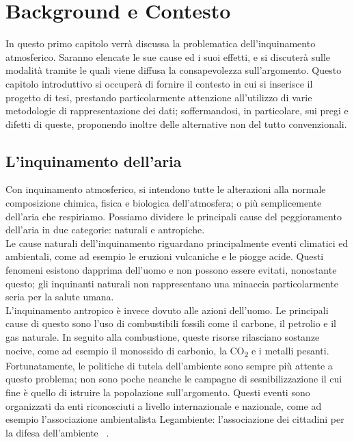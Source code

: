 \clearpage{\pagestyle{empty}\cleardoublepage}
\chapter{Background e Contesto}                %
\lhead[\fancyplain{}{\bfseries\thepage}]{\fancyplain{}{\bfseries\rightmark}}

In questo primo capitolo verrà discussa la problematica dell'inquinamento atmosferico.
Saranno elencate le sue cause ed i suoi effetti, e si discuterà sulle modalità tramite le quali viene diffusa la consapevolezza sull'argomento.
Questo capitolo introduttivo si occuperà di fornire il contesto in cui si inserisce il progetto di tesi, prestando particolarmente attenzione all'utilizzo di varie metodologie di rappresentazione dei dati; soffermandosi, in particolare, sui pregi e difetti di queste, proponendo inoltre delle alternative non del tutto convenzionali.

\section{L'inquinamento dell'aria}
Con inquinamento atmosferico, si intendono tutte le alterazioni alla normale composizione chimica, fisica e biologica dell’atmosfera; o più semplicemente dell’aria che respiriamo.
Possiamo dividere le principali cause del peggioramento dell’aria in due categorie: naturali e antropiche.
\\
Le cause naturali dell'inquinamento riguardano principalmente eventi climatici ed ambientali, come ad esempio le eruzioni vulcaniche e le piogge acide.
Questi fenomeni esistono dapprima dell'uomo e non possono essere evitati, nonostante questo; gli inquinanti naturali non rappresentano una minaccia particolarmente seria per la salute umana.
\\
L'inquinamento antropico è invece dovuto alle azioni dell'uomo. Le principali cause di questo sono l’uso di combustibili fossili come il carbone, il petrolio e il gas naturale.
In seguito alla combustione, queste risorse rilasciano sostanze nocive, come ad esempio il monossido di carbonio, la CO\textsubscript{2} e i metalli pesanti.
Fortunatamente, le politiche di tutela dell'ambiente sono sempre più attente a questo problema;
non sono poche neanche le campagne di sesnibilizzazione il cui fine è quello di istruire la popolazione sull'argomento. Questi eventi sono organizzati da enti riconosciuti a livello internazionale e nazionale, come ad esempio l'associazione ambientalista Legambiente: l'associazione dei cittadini per la difesa dell'ambiente ~\cite{la_mincrometrologia}.
\\
